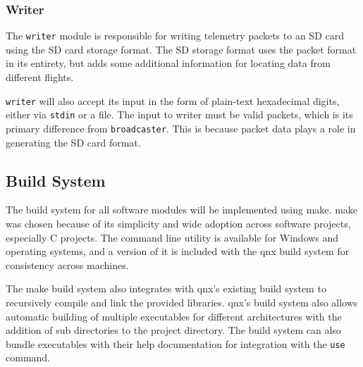 \subsubsection{Writer}

The \texttt{writer} module is responsible for writing  telemetry packets to an SD card using the
 SD card storage format. The SD storage format uses the packet format in its entirety, but adds
some additional information for locating data from different flights. \cite{sd-format}

\texttt{writer} will also accept its input in the form of plain-text hexadecimal digits, either via \texttt{\gls{stdin}}
or a file. The input to writer must be valid  packets, which is its primary difference from
\texttt{broadcaster}. This is because packet data plays a role in generating the SD card format.

\subsection{Build System}

The build system for all software modules will be implemented using \gls{make}. \Gls{make} was chosen because of its
simplicity and wide adoption across software projects, especially C projects. The command line utility is available for
Windows and  operating systems, and a version of it is included with the \gls{qnx} build system for
consistency across machines.

The \gls{make} build system also integrates with \gls{qnx}'s existing build system to recursively compile and link the
provided libraries. \Gls{qnx}'s build system also allows automatic building of multiple executables for different
architectures with the addition of sub directories to the project directory. \cite{qnx-dir-structure} The build system
can also bundle executables with their help documentation for integration with the \texttt{use} command.
\cite{qnx-dir-structure}
